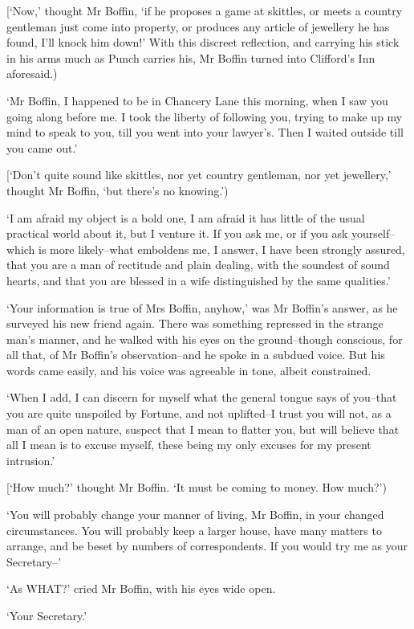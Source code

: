 [‘Now,’ thought Mr Boffin, ‘if he proposes a game at skittles, or meets
a country gentleman just come into property, or produces any article
of jewellery he has found, I’ll knock him down!’ With this discreet
reflection, and carrying his stick in his arms much as Punch carries
his, Mr Boffin turned into Clifford’s Inn aforesaid.)

‘Mr Boffin, I happened to be in Chancery Lane this morning, when I saw
you going along before me. I took the liberty of following you, trying
to make up my mind to speak to you, till you went into your lawyer’s.
Then I waited outside till you came out.’

[‘Don’t quite sound like skittles, nor yet country gentleman, nor yet
jewellery,’ thought Mr Boffin, ‘but there’s no knowing.’)

‘I am afraid my object is a bold one, I am afraid it has little of the
usual practical world about it, but I venture it. If you ask me, or if
you ask yourself--which is more likely--what emboldens me, I answer, I
have been strongly assured, that you are a man of rectitude and plain
dealing, with the soundest of sound hearts, and that you are blessed in
a wife distinguished by the same qualities.’

‘Your information is true of Mrs Boffin, anyhow,’ was Mr Boffin’s
answer, as he surveyed his new friend again. There was something
repressed in the strange man’s manner, and he walked with his eyes
on the ground--though conscious, for all that, of Mr Boffin’s
observation--and he spoke in a subdued voice. But his words came easily,
and his voice was agreeable in tone, albeit constrained.

‘When I add, I can discern for myself what the general tongue says of
you--that you are quite unspoiled by Fortune, and not uplifted--I trust
you will not, as a man of an open nature, suspect that I mean to flatter
you, but will believe that all I mean is to excuse myself, these being
my only excuses for my present intrusion.’

[‘How much?’ thought Mr Boffin. ‘It must be coming to money. How much?’)

‘You will probably change your manner of living, Mr Boffin, in your
changed circumstances. You will probably keep a larger house, have many
matters to arrange, and be beset by numbers of correspondents. If you
would try me as your Secretary--’

‘As WHAT?’ cried Mr Boffin, with his eyes wide open.

‘Your Secretary.’

